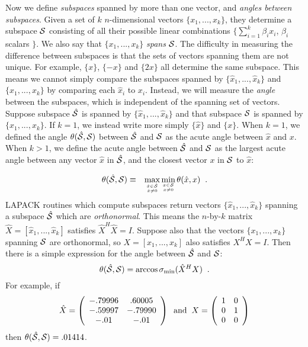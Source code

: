 Now we define {\em subspaces} spanned by more than one vector,
and {\em angles between subspaces}.
Given a set of $k$
$n$-dimensional vectors $\{ x_1 , ... , x_k \}$, they determine
a subspace $\cal S$ consisting of all their possible linear combinations
$\{ \sum_{i=1}^k \beta_i x_i$, $\beta_i$ scalars $ \}$. We also
say that $\{ x_1 , ... , x_k \}$ {\em spans} $\cal S$.
The difficulty in measuring the difference between subspaces is that
the sets of vectors spanning them are not unique.
For example, $\{ x \}$, $\{ -x \}$ and $\{ 2x \}$ all determine the
same subspace.
This means we cannot simply compare the subspaces spanned by
$\{ \hat{x}_1 , ... , \hat{x}_k \}$ and $\{ x_1 , ... , x_k \}$ by
comparing each $\hat{x}_i$ to $x_i$. Instead, we will measure the {\em angle}
between the subspaces, which is independent of the spanning set
of vectors. Suppose subspace $\hat{\cal S}$ is spanned by
$\{ \hat{x}_1 , ... , \hat{x}_k \}$ and that subspace $\cal S$
is spanned by $\{ x_1 , ... , x_k \}$. If $k=1$, we instead write more
simply $\{ \hat{x} \}$ and $\{ x \}$.
When $k=1$, we defined
the angle $\theta (\hat{\cal S}, {\cal S})$ between
$\hat{\cal S}$ and $\cal S$ as the acute angle
between $\hat{x}$ and $x$.
When $k>1$, we define the acute angle between $\hat{\cal S}$ and
${\cal S}$ as the largest acute angle between any vector $\hat{x}$ in
$\hat{\cal S}$, and the closest vector $x$ in $\cal S$ to $\hat{x}$:

\begin{eqnarray*}
\theta (\hat{\cal S}, {\cal S}) & \equiv  &
\max_{\hat{x} \in {\hat{\cal S}} \atop \hat{x} \neq 0}
\min_{x \in {\cal S} \atop x \neq 0}
\theta ( \hat{x},x ) \; \; .
\end{eqnarray*}
LAPACK routines which compute subspaces return
vectors $\{ \hat{x}_1 , ... , \hat{x}_k \}$ spanning a subspace
$\hat{\cal S}$ which are {\em orthonormal}. This means the
$n$-by-$k$ matrix $\hat{X}=[\hat{x}_1 , ... , \hat{x}_k]$
satisfies $\hat{X}^H \hat{X} = I$. Suppose also that
the vectors $\{ x_1 , ... , x_k \}$ spanning $\cal S$
are orthonormal, so $X = [ x_1 , ... , x_k ]$ also
satisfies $X^HX = I$.
Then there is a simple expression for the angle between
$\hat{\cal S}$ and $\cal S$:
\[
\theta ( \hat{\cal S}, {\cal S} ) = \arccos \sigma_{\min} ( \hat{X}^H X ) \; \; .
\]
For example, if
\[
\hat{X} = \bmat{cc} -.79996 & .60005 \\ -.59997 & -.79990 \\ -.01 & -.01 \emat
\; \; {\rm and} \; \;
X = \bmat{cc} 1 & 0 \\ 0 & 1 \\ 0 & 0 \emat
\]
then $\theta ( \hat{\cal S}, {\cal S} ) = .01414$.

